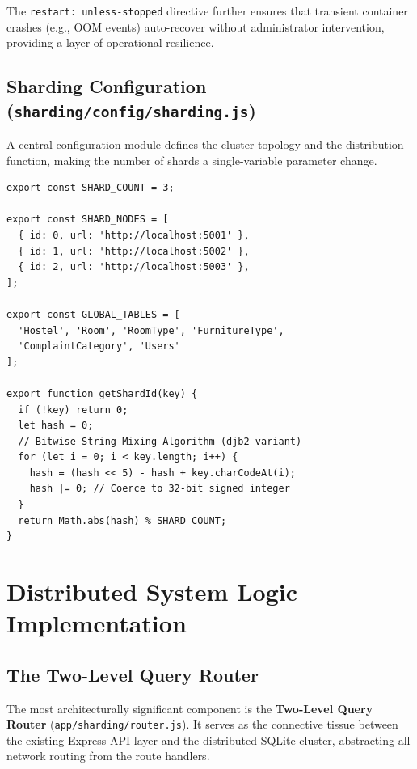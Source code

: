 \documentclass[sigconf]{acmart}
\begin{document}
The \texttt{restart: unless-stopped} directive further ensures that transient container crashes (e.g., OOM events) auto-recover without administrator intervention, providing a layer of operational resilience.

\subsection{Sharding Configuration (\texttt{sharding/config/sharding.js})}

A central configuration module defines the cluster topology and the distribution function, making the number of shards a single-variable parameter change.

\begin{lstlisting}[style=jsstyle, caption={Hash-Based Partitioning Logic (config/sharding.js)}]
export const SHARD_COUNT = 3;

export const SHARD_NODES = [
  { id: 0, url: 'http://localhost:5001' },
  { id: 1, url: 'http://localhost:5002' },
  { id: 2, url: 'http://localhost:5003' },
];

export const GLOBAL_TABLES = [
  'Hostel', 'Room', 'RoomType', 'FurnitureType',
  'ComplaintCategory', 'Users'
];

export function getShardId(key) {
  if (!key) return 0;
  let hash = 0;
  // Bitwise String Mixing Algorithm (djb2 variant)
  for (let i = 0; i < key.length; i++) {
    hash = (hash << 5) - hash + key.charCodeAt(i);
    hash |= 0; // Coerce to 32-bit signed integer
  }
  return Math.abs(hash) % SHARD_COUNT;
}
\end{lstlisting}

\section{Distributed System Logic Implementation}

\subsection{The Two-Level Query Router}

The most architecturally significant component is the \textbf{Two-Level Query Router} (\texttt{app/sharding/router.js}). It serves as the connective tissue between the existing Express API layer and the distributed SQLite cluster, abstracting all network routing from the route handlers.
\end{document}
